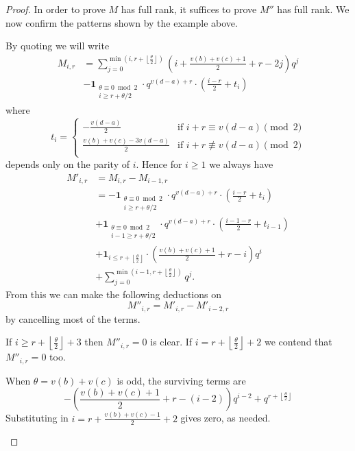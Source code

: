 \begin{proof}
  In order to prove $M$ has full rank, it suffices to prove $M''$ has full rank.
  We now confirm the patterns shown by the example above.

  By quoting  we will write
  \begin{align*}
    M_{i,r}
    &= \sum_{j=0}^{\min(i,r + \left\lfloor \frac{\theta}{2} \right\rfloor)}
      \left( i + \frac{v(b)+v(c)+1}{2} + r - 2j \right) q^j \\
    &- \mathbf{1}_{\substack{\theta \equiv 0 \bmod 2 \\ i \ge r + \theta/2}}
      \cdot q^{v(d-a)+r} \cdot \left( \frac{i-r}{2} + t_i \right)
  \end{align*}
  where
  \[
    t_i = \begin{cases}
      -\frac{v(d-a)}{2} &\text{if } i + r \equiv v(d-a) \pmod 2 \\
      \frac{v(b)+v(c)-3v(d-a)}{2} &\text{if } i + r \not\equiv v(d-a) \pmod 2 \\
    \end{cases}
  \]
  depends only on the parity of $i$.
  Hence for $i \ge 1$ we always have
  \begin{align*}
    M'_{i,r}
    &= M_{i,r} - M_{i-1,r} \\
    &=- \mathbf{1}_{\substack{\theta \equiv 0 \bmod 2 \\ i \ge r + \theta/2}}
      \cdot q^{v(d-a)+r} \cdot \left( \frac{i-r}{2} + t_i \right) \\
    &+ \mathbf{1}_{\substack{\theta \equiv 0 \bmod 2 \\ i-1 \ge r + \theta/2}}
      \cdot q^{v(d-a)+r} \cdot \left( \frac{i-1-r}{2} + t_{i-1} \right) \\
    &+ \mathbf{1}_{i \le r + \left\lfloor \frac{\theta}{2} \right\rfloor} \cdot
      \left( \frac{v(b)+v(c)+1}{2} + r - i \right) q^i \\
    &+ \sum_{j=0}^{\min(i-1,r + \left\lfloor \frac{\theta}{2} \right\rfloor)} q^j.
  \end{align*}
  From this we can make the following deductions
  on \[ M''_{i,r} = M'_{i,r} - M'_{i-2,r} \]
  by cancelling most of the terms.
  \begin{itemize}
    \ii If $i \ge r + \left\lfloor \frac{\theta}{2} \right\rfloor + 3$
    then $M''_{i,r} = 0$ is clear.
    \ii If $i = r + \left\lfloor \frac{\theta}{2} \right\rfloor + 2$
    we contend that $M''_{i,r} = 0$ too.
    \begin{itemize}
      \ii When $\theta = v(b) + v(c)$ is odd, the surviving terms are
      \[
        - \left( \frac{v(b)+v(c)+1}{2} + r - (i-2) \right) q^{ i-2}
        + q^{r + \left\lfloor \frac{\theta}{2} \right\rfloor}
      \]
      Substituting in $i = r + \frac{v(b)+v(c)-1}{2} + 2$ gives zero, as needed.


\end{itemize}
\end{itemize}
\end{proof}
